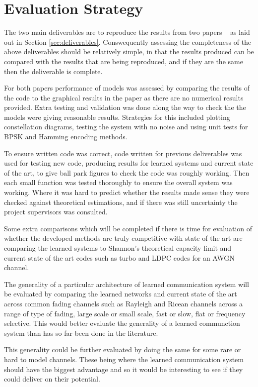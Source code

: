 \documentclass[12pt,onecolumn,letterpaper]{article}
\begin{document}
\FloatBarrier
\section{Evaluation Strategy}

The two main deliverables are to reproduce the results from two papers ~\cite{oShea,Aoudia} as laid out in Section \ref{sec:deliverables}. Conswequently assessing the completeness of the above deliverables should be relatively simple, in that the results produced can be compared with the results that are being reproduced, and if they are the same then the deliverable is complete.

For both papers performance of models was assessed by comparing the results of the code to the graphical results in the paper as there are no numerical results provided. Extra testing and validation was done along the way to check the the models were giving reasonable results. Strategies for this included plotting constellation diagrams, testing the system with no noise and using unit tests for BPSK and Hamming encoding methods.

To ensure written code was correct, code written for previous deliverables was used for testing new code, producing results for learned systems and current state of the art, to give ball park figures to check the code was roughly working. Then each small function was tested thoroughly to ensure the overall system was working. Where it was hard to predict whether the results made sense they were checked against theoretical estimations, and if there was still uncertainty the project supervisors was consulted. 

Some extra comparisons which will be completed if there is time for evaluation of whether the developed methods are truly competitive with state of the art are comparing the learned systems to Shannon's theoretical capacity limit and current state of the art codes such as turbo and LDPC codes for an AWGN channel.

The generality of a particular architecture of learned communication system will be evaluated by comparing the learned networks and current state of the art across common fading channels such as Rayleigh and Ricean channels across a range of type of fading, large scale or small scale, fast or slow, flat or frequency selective. This would better evaluate the generality of a learned communction system than has so far been done in the literature.

This generality could be further evaluated by doing the same for some rare or hard to model channels. These being where the learned communication system should have the biggest advantage and so it would be interesting to see if they could deliver on their potential.
\end{document}
